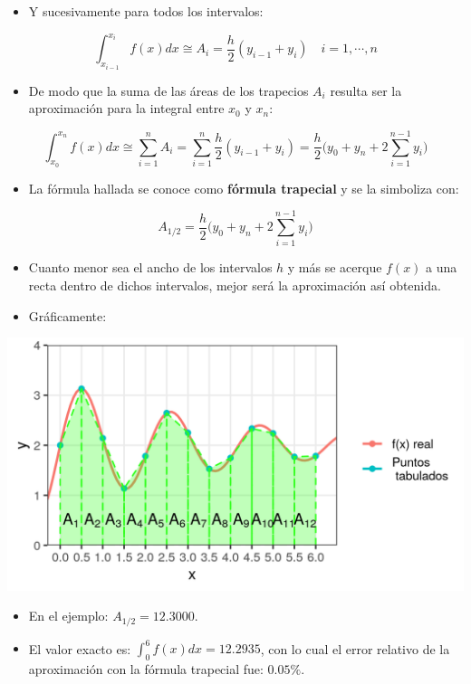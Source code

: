 \documentclass[openany]{book}
\providecommand{\tightlist}{%
  \setlength{\itemsep}{0pt}\setlength{\parskip}{0pt}}
\begin{document}
\begin{itemize}
\tightlist
\item
  Y sucesivamente para todos los intervalos:
\end{itemize}

\[
\int_{x_{i-1}}^{x_i} f(x)dx \cong A_i = \frac{h}{2} (y_{i-1} + y_i) \quad i = 1, \cdots, n
\]

\begin{itemize}
\tightlist
\item
  De modo que la suma de las áreas de los trapecios \(A_i\) resulta ser la aproximación para la integral entre \(x_0\) y \(x_n\):
\end{itemize}

\[
\int_{x_{0}}^{x_n} f(x)dx \cong \sum_{i=1}^n A_i = \sum_{i=1}^n \frac{h}{2} (y_{i-1} + y_i) = \frac{h}{2} \Big( y_0 + y_n + 2 \sum_{i = 1}^{n-1} y_i \Big)
\]

\begin{itemize}
\tightlist
\item
  La fórmula hallada se conoce como \textbf{fórmula trapecial} y se la simboliza con:
\end{itemize}

\[
A_{1/2} = \frac{h}{2} \Big( y_0 + y_n + 2 \sum_{i = 1}^{n-1} y_i \Big)
\]

\begin{itemize}
\tightlist
\item
  Cuanto menor sea el ancho de los intervalos \(h\) y más se acerque \(f(x)\) a una recta dentro de dichos intervalos, mejor será la aproximación así obtenida.
\item
  Gráficamente:
\end{itemize}

\begin{center}\includegraphics[width=0.85\linewidth]{Plots/U4/Unidad4_2_g4} \end{center}

\begin{itemize}
\tightlist
\item
  En el ejemplo: \(A_{1/2} = 12.3000\).
\item
  El valor exacto es: \(\int_0^{6}f(x)dx = 12.2935\), con lo cual el error relativo de la aproximación con la fórmula trapecial fue: \(0.05\%\).
\end{itemize}
\end{document}
